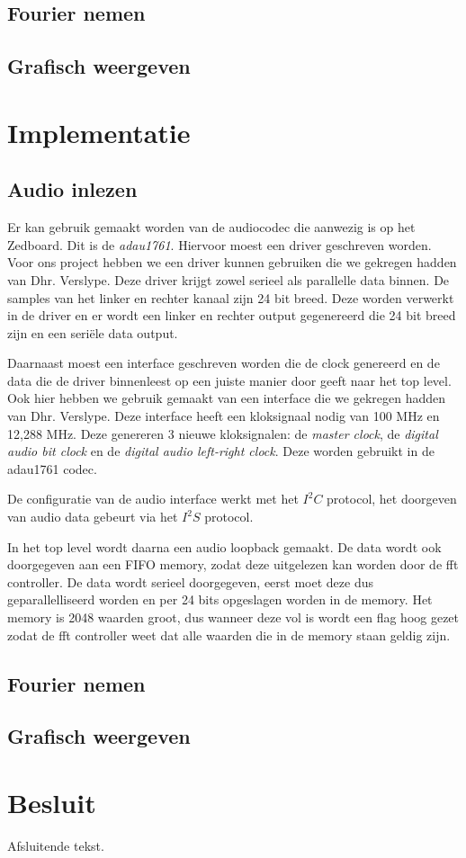 \documentclass[a4paper,kul]{kulakarticle} %
\begin{document}
\subsection{Fourier nemen}

\subsection{Grafisch weergeven}

\section{Implementatie}

\subsection{Audio inlezen}

Er kan gebruik gemaakt worden van de audiocodec die aanwezig is op het Zedboard. Dit is de \textit{adau1761}. Hiervoor moest een driver geschreven worden. Voor ons project hebben we een driver kunnen gebruiken die we gekregen hadden van Dhr. Verslype. Deze driver krijgt zowel serieel als parallelle data binnen. De samples van het linker en rechter kanaal zijn 24 bit breed. Deze worden verwerkt in de driver en er wordt een linker en rechter output gegenereerd die 24 bit breed zijn en een seriële data output. \newline

Daarnaast moest een interface geschreven worden die de clock genereerd en de data die de driver binnenleest op een juiste manier door geeft naar het top level. Ook hier hebben we gebruik gemaakt van een interface die we gekregen hadden van Dhr. Verslype. Deze interface heeft een kloksignaal nodig van 100 MHz en 12,288 MHz. Deze genereren 3 nieuwe kloksignalen: de \textit{master clock}, de \textit{digital audio bit clock} en de \textit{digital audio left-right clock}. Deze worden gebruikt in de adau1761 codec. \newline

De configuratie van de audio interface werkt met het $I^2C$ protocol, het doorgeven van audio data gebeurt via het $I^2S$ protocol.\newline

In het top level wordt daarna een audio loopback gemaakt. De data wordt ook doorgegeven aan een FIFO memory, zodat deze uitgelezen kan worden door de fft controller. De data wordt serieel doorgegeven, eerst moet deze dus geparallelliseerd worden en per 24 bits opgeslagen worden in de memory. Het memory is 2048 waarden groot, dus wanneer deze vol is wordt een flag hoog gezet zodat de fft controller weet dat alle waarden die in de memory staan geldig zijn. 

\subsection{Fourier nemen}

\subsection{Grafisch weergeven}

\section{Besluit}

Afsluitende tekst.
\end{document}
